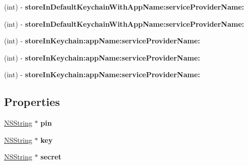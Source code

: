 \begin{DoxyCompactItemize}
\item 
\hypertarget{interface_o_a_token_a3677526ece157e96975aa0a5910bf980}{
(int) -\/ {\bfseries store\-In\-Default\-Keychain\-With\-App\-Name\-:service\-Provider\-Name\-:}}
\label{interface_o_a_token_a3677526ece157e96975aa0a5910bf980}

\item 
\hypertarget{interface_o_a_token_a3677526ece157e96975aa0a5910bf980}{
(int) -\/ {\bfseries store\-In\-Default\-Keychain\-With\-App\-Name\-:service\-Provider\-Name\-:}}
\label{interface_o_a_token_a3677526ece157e96975aa0a5910bf980}

\item 
\hypertarget{interface_o_a_token_a04351527308dfdbc81be200851ee04df}{
(int) -\/ {\bfseries store\-In\-Keychain\-:app\-Name\-:service\-Provider\-Name\-:}}
\label{interface_o_a_token_a04351527308dfdbc81be200851ee04df}

\item 
\hypertarget{interface_o_a_token_a04351527308dfdbc81be200851ee04df}{
(int) -\/ {\bfseries store\-In\-Keychain\-:app\-Name\-:service\-Provider\-Name\-:}}
\label{interface_o_a_token_a04351527308dfdbc81be200851ee04df}

\item 
\hypertarget{interface_o_a_token_a04351527308dfdbc81be200851ee04df}{
(int) -\/ {\bfseries store\-In\-Keychain\-:app\-Name\-:service\-Provider\-Name\-:}}
\label{interface_o_a_token_a04351527308dfdbc81be200851ee04df}

\end{DoxyCompactItemize}
\subsection*{\-Properties}
\begin{DoxyCompactItemize}
\item 
\hypertarget{interface_o_a_token_a766d7310077717f97656a70d364448eb}{
\hyperlink{class_n_s_string}{\-N\-S\-String} $\ast$ {\bfseries pin}}
\label{interface_o_a_token_a766d7310077717f97656a70d364448eb}

\item 
\hypertarget{interface_o_a_token_a178cec1e894832b96479daeed551b465}{
\hyperlink{class_n_s_string}{\-N\-S\-String} $\ast$ {\bfseries key}}
\label{interface_o_a_token_a178cec1e894832b96479daeed551b465}

\item 
\hypertarget{interface_o_a_token_a569a67b2f922247cb2d0b1e8a23f08c2}{
\hyperlink{class_n_s_string}{\-N\-S\-String} $\ast$ {\bfseries secret}}
\label{interface_o_a_token_a569a67b2f922247cb2d0b1e8a23f08c2}

\end{DoxyCompactItemize}


